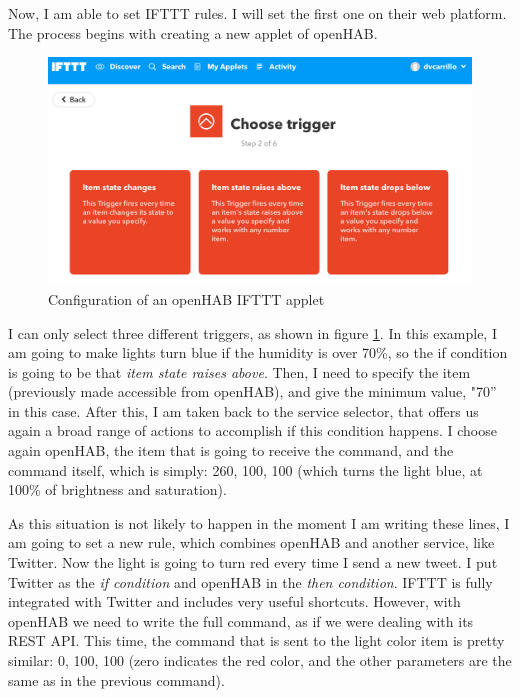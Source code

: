 Now, I am able to set IFTTT rules. I will set the first one on their web platform. The process begins with creating a new applet
of openHAB.

\begin{figure}
	\centering
	\includegraphics[width=1\textwidth]{images/Chapter_06/selection-iftt.png}
	\caption{Configuration of an openHAB IFTTT applet}
	\label{fig:selection-iftt}
\end{figure}

I can only select three different triggers, as shown in figure \ref{fig:selection-iftt}. In this example, I am going to make lights
turn blue if the humidity is over 70\%, so the if condition is going to be that \textit{item state raises above}. Then, I need to
specify the item (previously made accessible from openHAB), and give the minimum value, "70” in this case. After this, I am taken
back to the service selector, that offers us again a broad range of actions to accomplish if this condition happens. I choose again
openHAB, the item that is going to receive the command, and the command itself, which is simply: 260, 100, 100 (which turns the
light blue, at 100\% of brightness and saturation).

As this situation is not likely to happen in the moment I am writing these lines, I am going to set a new rule, which combines
openHAB and another service, like Twitter. Now the light is going to turn red every time I send a new tweet. I put Twitter as the
\textit{if condition} and openHAB in the \textit{then condition}. IFTTT is fully integrated with Twitter and includes very useful
shortcuts. However, with openHAB we need to write the full command, as if we were dealing with its REST API. This time, the command
that is sent to the light color item is pretty similar: 0, 100, 100 (zero indicates the red color, and the other parameters are the
same as in the previous command).

